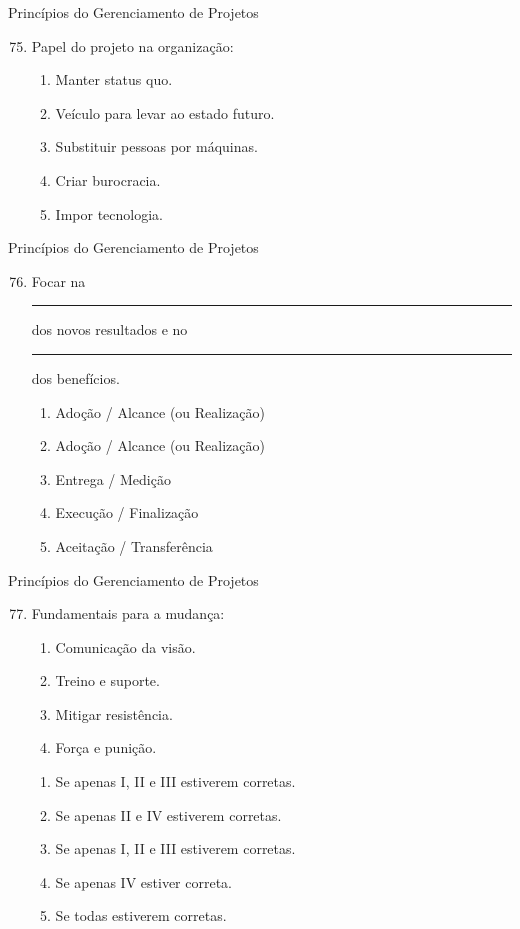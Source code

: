 \documentclass{beamer}
\begin{document}
\begin{frame}{Princípios do Gerenciamento de Projetos}
	\begin{enumerate}
		\setcounter{enumi}{74}
		\justifying
		\item Papel do projeto na organização:
		\begin{enumerate}[a]
			\item Manter status quo.
			\item \alert<2>{Veículo para levar ao estado futuro.}
			\item Substituir pessoas por máquinas.
			\item Criar burocracia.
			\item Impor tecnologia.
		\end{enumerate}
	\end{enumerate}
\end{frame}

\begin{frame}{Princípios do Gerenciamento de Projetos}
	\begin{enumerate}
		\setcounter{enumi}{75}
		\justifying
		\item Focar na \rule{50px}{0.7pt} dos novos resultados e no \rule{50px}{0.7pt} dos benefícios.
		\begin{enumerate}[a]
			\item Adoção / Alcance (ou Realização)
			\item \alert<2>{Adoção / Alcance (ou Realização)}
			\item Entrega / Medição
			\item Execução / Finalização
			\item Aceitação / Transferência
		\end{enumerate}
	\end{enumerate}
\end{frame}

\begin{frame}{Princípios do Gerenciamento de Projetos}
	\begin{enumerate}
		\setcounter{enumi}{76}
		\justifying
		\item Fundamentais para a mudança:
		\begin{enumerate}[I]
			\item Comunicação da visão.
			\item Treino e suporte.
			\item Mitigar resistência.
			\item Força e punição.
		\end{enumerate}
		\begin{enumerate}[a]
			\item Se apenas I, II e III estiverem corretas.
			\item Se apenas II e IV estiverem corretas.
			\item \alert<2>{Se apenas I, II e III estiverem corretas.}
			\item Se apenas IV estiver correta.
			\item Se todas estiverem corretas.
		\end{enumerate}
	\end{enumerate}
\end{frame}
\end{document}

